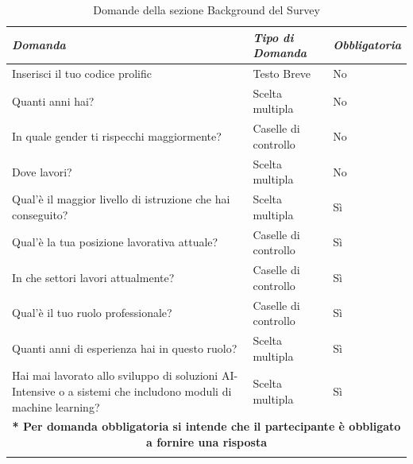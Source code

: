    \begin{longtable}{| p{} | p{} | p{} |} 
\hline\textbf{\textit{Domanda}} & \textbf{\textit{Tipo di Domanda}} & \textbf{\textit{Obbligatoria}}\\
\hline
\endhead 

\hline 
 Inserisci il tuo codice prolific

& Testo Breve

& No 

\\ \hline
\rowcolor{Gray}
Quanti anni hai?        

&  Scelta multipla

& No

\\ \hline

 In quale gender ti rispecchi maggiormente?

& Caselle di controllo

& No

\\ \hline
\rowcolor{Gray}
Dove lavori?        

&  Scelta multipla

& No
\\ \hline


 Qual'è il maggior livello di istruzione che hai conseguito?

& Scelta multipla

& Sì

\\ \hline
\rowcolor{Gray}
Qual'è la tua posizione lavorativa attuale?        

&  Caselle di controllo

& Sì

\\ \hline
In che settori lavori attualmente?        

&  Caselle di controllo

& Sì

\\ \hline
\rowcolor{Gray}
Qual'è il tuo ruolo professionale?        

&  Caselle di controllo

& Sì

\\ \hline
Quanti anni di esperienza hai in questo ruolo?        

&  Scelta multipla

& Sì



\\ \hline
\rowcolor{Gray}
Hai mai lavorato allo sviluppo di soluzioni AI-Intensive o a sistemi che includono moduli di machine learning?        

&  Scelta multipla

& Sì

\\ \hline
\multicolumn{3}{|c|}{\footnotesize \textbf{* Per domanda obbligatoria si intende che il partecipante è obbligato a fornire una risposta}}
\\\hline
\caption{Domande della sezione Background del Survey} %
\label{tab:myfirstlongtable}
\end{longtable}

